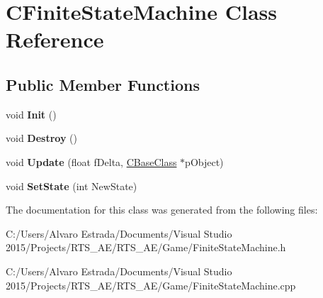 \hypertarget{class_c_finite_state_machine}{}\section{C\+Finite\+State\+Machine Class Reference}
\label{class_c_finite_state_machine}
\subsection*{Public Member Functions}
\begin{DoxyCompactItemize}
\item 
void {\bfseries Init} ()\hypertarget{class_c_finite_state_machine_a0d402f0d3f95e65239479157733f9f39}{}\label{class_c_finite_state_machine_a0d402f0d3f95e65239479157733f9f39}

\item 
void {\bfseries Destroy} ()\hypertarget{class_c_finite_state_machine_a9455b5fec7433363a536a06a2212b496}{}\label{class_c_finite_state_machine_a9455b5fec7433363a536a06a2212b496}

\item 
void {\bfseries Update} (float f\+Delta, \hyperlink{class_c_base_class}{C\+Base\+Class} $\ast$p\+Object)\hypertarget{class_c_finite_state_machine_abe5786aa5dd9506b8fca71a7b20af28a}{}\label{class_c_finite_state_machine_abe5786aa5dd9506b8fca71a7b20af28a}

\item 
void {\bfseries Set\+State} (int New\+State)\hypertarget{class_c_finite_state_machine_a1b397a92981ec157fd96ad4a74d4440d}{}\label{class_c_finite_state_machine_a1b397a92981ec157fd96ad4a74d4440d}

\end{DoxyCompactItemize}


The documentation for this class was generated from the following files\+:\begin{DoxyCompactItemize}
\item 
C\+:/\+Users/\+Alvaro Estrada/\+Documents/\+Visual Studio 2015/\+Projects/\+R\+T\+S\+\_\+\+A\+E/\+R\+T\+S\+\_\+\+A\+E/\+Game/Finite\+State\+Machine.\+h\item 
C\+:/\+Users/\+Alvaro Estrada/\+Documents/\+Visual Studio 2015/\+Projects/\+R\+T\+S\+\_\+\+A\+E/\+R\+T\+S\+\_\+\+A\+E/\+Game/Finite\+State\+Machine.\+cpp\end{DoxyCompactItemize}
